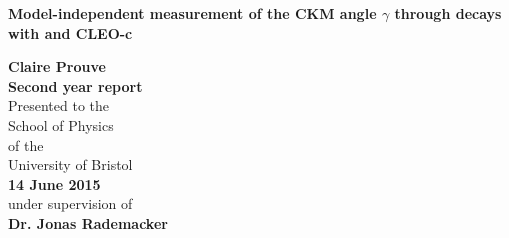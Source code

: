 \titlehead{%
} %
\titlefoot{%
}

\newsavebox{\Prof}

\begin{titlepage}
\begin{center}
\hbox{} %
\vspace*{2.5cm}
{\Huge\bfseries Model-independent measurement of the CKM angle $\gamma $ through \BToDK decays with \lhcb and CLEO-c \par}
\vskip 1.5cm
\large{ \textbf{Claire Prouve}}\normalsize\\
\vspace{2.cm}
\large{\textbf{Second year report}}\normalsize\\
\vspace*{1.5cm}
Presented to the \\
School of Physics\\
of the \\
University of Bristol\\

 \textbf{14 June 2015}\\%
  under supervision of\\
\textbf{Dr. Jonas Rademacker}\\
\vspace*{0.5cm}
\end{center}
\vspace*{1.3cm}
\end{titlepage}

